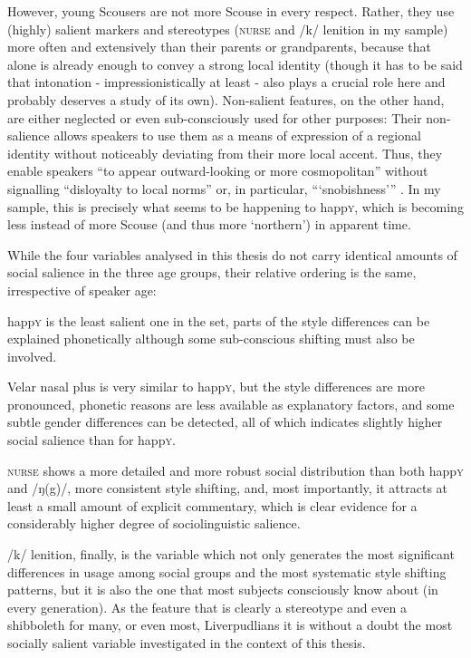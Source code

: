 However, young Scousers are not more Scouse in every respect.
Rather, they use (highly) salient markers and stereotypes (\textsc{nurse} and /k/ lenition in my sample) more often and extensively than their parents or grandparents, because that alone is already enough to convey a strong local identity (though it has to be said that intonation - impressionistically at least - also plays a crucial role here and probably deserves a study of its own).
Non-salient features, on the other hand, are either neglected or even sub-consciously used for other purposes: Their non-salience allows speakers to use them as a means of expression of a regional identity without noticeably deviating from their more local accent.
Thus, they enable speakers ``to appear outward-looking or more cosmopolitan'' without signalling ``disloyalty to local norms'' or, in particular, ``{}`snobishness'{}'' \parencite[13--14]{foulkesdocherty1999a}.
In my sample, this is precisely what seems to be happening to happ\textsc{y}, which is becoming less instead of more Scouse (and thus more `northern') in apparent time.

While the four variables analysed in this thesis do not carry identical amounts of social salience in the three age groups, their relative ordering is the same, irrespective of speaker age:
\begin{inparaenum}[(1)]
	\item happ\textsc{y} is the least salient one in the set, parts of the style differences can be explained phonetically although some sub-conscious shifting must also be involved.
	\item Velar nasal plus is very similar to happ\textsc{y}, but the style differences are more pronounced, phonetic reasons are less available as explanatory factors, and some subtle gender differences can be detected, all of which indicates slightly higher social salience than for happ\textsc{y}.
	\item \textsc{nurse} shows a more detailed and more robust social distribution than both happ\textsc{y} and /ŋ(g)/, more consistent style shifting, and, most importantly, it attracts at least a small amount of explicit commentary, which is clear evidence for a considerably higher degree of sociolinguistic salience.
	\item /k/ lenition, finally, is the variable which not only generates the most significant differences in usage among social groups and the most systematic style shifting patterns, but it is also the one that most subjects consciously know about (in every generation).
	As the feature that is clearly a stereotype and even a shibboleth for many, or even most, Liverpudlians it is without a doubt the most socially salient variable investigated in the context of this thesis.
\end{inparaenum}